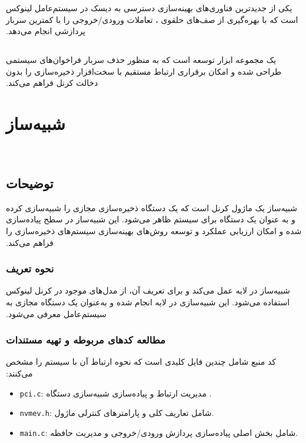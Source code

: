 ‫
‫\subsection*{}
‫ یکی از جدیدترین فناوری‌های بهینه‌سازی دسترسی به دیسک در سیستم‌عامل لینوکس است که با بهره‌گیری از صف‌های حلقوی ، تعاملات ورودی/خروجی را با کمترین سربار پردازشی انجام می‌دهد.
‫
‫\subsection*{}
‫ یک مجموعه ابزار توسعه است که به منظور حذف سربار فراخوان‌های سیستمی طراحی شده و امکان برقراری ارتباط مستقیم با سخت‌افزار ذخیره‌سازی را بدون دخالت کرنل فراهم می‌کند.
‫
‫\section{شبیه‌ساز }
‫
‫\subsection*{توضیحات}
‫شبیه‌ساز  یک ماژول کرنل است که یک دستگاه ذخیره‌سازی مجازی را شبیه‌سازی کرده و به عنوان یک دستگاه  برای سیستم ظاهر می‌شود. این شبیه‌ساز در سطح  پیاده‌سازی شده و امکان ارزیابی عملکرد و توسعه روش‌های بهینه‌سازی سیستم‌های ذخیره‌سازی را فراهم می‌کند.
‫
‫\subsubsection*{نحوه تعریف }
‫شبیه‌ساز  در لایه  عمل می‌کند و برای تعریف آن، از مدل‌های  موجود در کرنل لینوکس استفاده می‌شود. این شبیه‌سازی در لایه  انجام شده و به‌عنوان یک دستگاه مجازی به سیستم‌عامل معرفی می‌شود.
‫
‫\subsubsection*{مطالعه کدهای مربوطه و تهیه مستندات}
‫کد منبع  شامل چندین فایل کلیدی است که نحوه ارتباط آن با سیستم را مشخص می‌کنند:
‫\begin{itemize}
‫	\item \texttt{pci.c}: مدیریت ارتباط  و پیاده‌سازی شبیه‌سازی دستگاه .
‫	\item \texttt{nvmev.h}: شامل تعاریف کلی و پارامترهای کنترلی ماژول.
‫	\item \texttt{main.c}: شامل بخش اصلی پیاده‌سازی پردازش ورودی/خروجی و مدیریت حافظه.
‫\end{itemize}

